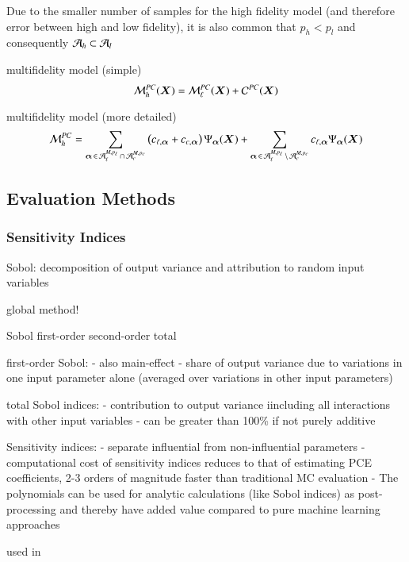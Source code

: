 Due to the smaller number of samples for the high fidelity model (and therefore error between high and low fidelity), it is also
common that $p_h < p_l$ and consequently $\mathcal{A}_h \subset \mathcal{A}_l$

multifidelity model (simple)
\begin{equation}
    \mathcal{M}_h^{PC}(\bm X) = \mathcal{M}_\ell^{PC}(\bm X) + \mathcal{C}^{PC}(\bm X)
\end{equation}

multifidelity model (more detailed)
\begin{equation}
    \mathcal{M}_h^{PC} = \sum_{{\bm{\alpha}}\,\in\,\mathcal{A}_\ell^{M,p_\ell} \,\cap\, \mathcal{A}_c^{M,p_c}}
    \left(
     c_{\ell,{\bm{\alpha}}} + c_{c,{\bm{\alpha}}}
    \right) \Psi_{\bm{\alpha}}(\bm X) + 
    \sum_{{\bm{\alpha}}\,\in\,\mathcal{A}_\ell^{M,p_\ell} \,\setminus\, \mathcal{A}_c^{M,p_c}}
    c_{\ell,{\bm{\alpha}}} \Psi_{\bm{\alpha}}(\bm X)
\end{equation}

\subsection{Evaluation Methods}
\label{sec:evaluationmethods}

\subsubsection{Sensitivity Indices}

Sobol: decomposition of output variance and attribution to random input variables

global method!

Sobol first-order second-order total

first-order Sobol:
- also main-effect
- share of output variance due to variations in one input parameter alone (averaged over variations in other input parameters)

total Sobol indices:
- contribution to output variance iincluding all interactions with other input variables
- can be greater than 100\% if not purely additive

Sensitivity indices:
- separate influential from non-influential parameters
- computational cost of sensitivity indices reduces to that of estimating PCE coefficients, 2-3 orders of magnitude faster than traditional MC evaluation \cite{sudret_global_2008}
- The polynomials can be used for analytic calculations (like Sobol indices) as post-processing and thereby have added value compared to pure machine learning approaches

used in \cite{trondle_trade-offs_2020,mavromatidis_uncertainty_2018}

